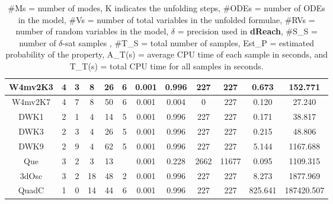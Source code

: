 \begin{table}[h!]
\begin{tabular}{c|c|c|c|c|c|c|c|c|c|c|c}
    W4mv2K3       & 4       & 3 & 8      & 26     & 6     & 0.001 & 0.996      & 227         & 227        & 0.673   & 152.771      \\ \hline
    W4mv2K7       & 4       & 7 & 8      & 50     & 6     & 0.001 & 0.004     & 0         & 227        & 0.120    & 27.240          \\ \hline
    DWK1      & 2       & 1 & 4      & 14    & 5     & 0.001 & 0.996  & 227       & 227      & 0.171   & 38.817      \\ \hline
    DWK3      & 2       & 3 & 4      & 26    & 5     & 0.001 & 0.996  & 227       & 227      & 0.215    & 48.806      \\ \hline
    DWK9      & 2       & 9 & 4      & 62    & 5     & 0.001 & 0.996  & 227       & 227      & 5.144   &  1167.688      \\ \hline
    Que       & 3       & 2 & 3      & 13     & ~     & 0.001 & 0.228      & 2662         & 11677        & 0.095   & 1109.315   \\ \hline
    3dOsc     & 3       & 2 & 18      & 48     & 2     & 0.001 & 0.996      & 227         & 227        & 8.273  & 1877.969   \\ \hline
    QuadC     & 1       & 0 & 14      & 44     & 6     & 0.001 & 0.996      & 227         & 227        & 825.641 & 187420.507   \\ \hline
    \end{tabular}
    \caption {\#Ms = number of modes, K indicates the unfolding steps, \#ODEs = number of ODEs in the model, \#Vs = number of total variables in the unfolded formulae, \#RVs = number of random variables in the model, $\delta$ = precision used in 
{\bf dReach}, \#S\_S = number of $\delta$-sat samples , \#T\_S = total number of samples, Est\_P = estimated 
probability of the property,  A\_T(s) = average CPU time of each sample in seconds, and T\_T(s) = total CPU time for all samples in seconds.}
    \label{table:exp}
\end{table}
\vspace{-1.1cm}
